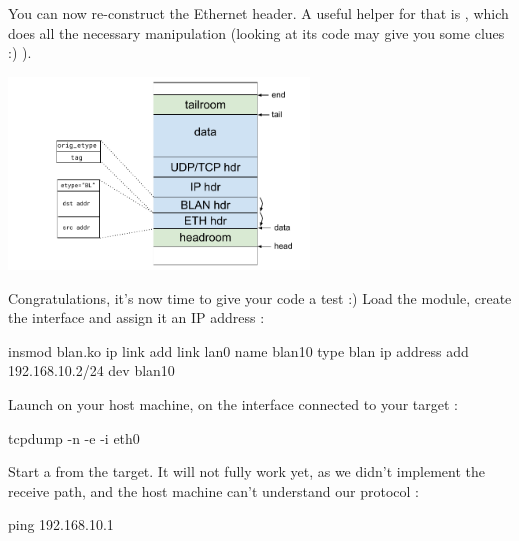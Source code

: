 You can now re-construct the Ethernet header. A useful helper for that is , which does all the necessary  manipulation (looking at its code may give you some clues :) ).

\begin{center}
\includegraphics[width=0.6\textwidth]{labs/networking-skb/03_blan_skb.pdf}
\end{center}

Congratulations, it's now time to give your code a test :) Load the module, create the interface and assign it an IP address :

\begin{targetbashinput}
insmod blan.ko
ip link add link lan0 name blan10 type blan
ip address add 192.168.10.2/24 dev blan10
\end{targetbashinput}

Launch  on your host machine, on the interface connected to your target :

\begin{hostbashinput}
tcpdump -n -e -i eth0
\end{hostbashinput}

Start a  from the target. It will not fully work yet, as we didn't implement the receive path, and the host machine can't understand our protocol :

\begin{targetbashinput}
ping 192.168.10.1
\end{targetbashinput}

